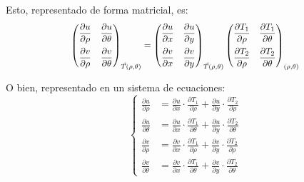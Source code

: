 Esto, representado de forma matricial, es:
\begin{equation*}
    \scale{0.9}{
    \begin{pmatrix}
        \dfrac{\partial u}{\partial \rho} & \dfrac{\partial u}{\partial \theta}
        \\[1em]
        \dfrac{\partial v}{\partial \rho} & \dfrac{\partial v}{\partial \theta}
    \end{pmatrix}_{\Vec{T}(\rho,\theta)}
    =
    \begin{pmatrix}
        \dfrac{\partial u}{\partial x} & \dfrac{\partial u}{\partial y}
        \\[1em]
        \dfrac{\partial v}{\partial x} & \dfrac{\partial v}{\partial y}
    \end{pmatrix}_{\Vec{T}(\rho,\theta)}
    \begin{pmatrix}
        \dfrac{\partial T_1}{\partial \rho} & \dfrac{\partial T_1}{\partial \theta}
        \\[1em]
        \dfrac{\partial T_2}{\partial \rho} & \dfrac{\partial T_2}{\partial \theta}
    \end{pmatrix}_{(\rho,\theta)}
    }
\end{equation*}

O bien, representado en un sistema de ecuaciones:
\begin{equation*}
    \left\{
    \begin{aligned}
        \frac{\partial u}{\partial \rho} &=
        \frac{\partial u}{\partial x} \cdot \frac{\partial T_1}{\partial \rho} + \frac{\partial u}{\partial y} \cdot \frac{\partial T_2}{\partial \rho}
        \\[1ex]
        \frac{\partial u}{\partial \theta} &=
        \frac{\partial u}{\partial x} \cdot \frac{\partial T_1}{\partial \theta} + \frac{\partial u}{\partial y} \cdot \frac{\partial T_2}{\partial \theta}
        \\[1ex]
        \frac{\partial v}{\partial \rho} &=
        \frac{\partial v}{\partial x} \cdot \frac{\partial T_1}{\partial \rho} + \frac{\partial v}{\partial y} \cdot \frac{\partial T_2}{\partial \rho}
        \\[1ex]
        \frac{\partial v}{\partial \theta} &=
        \frac{\partial v}{\partial x} \cdot \frac{\partial T_1}{\partial \theta} + \frac{\partial v}{\partial y} \cdot \frac{\partial T_2}{\partial \theta}
    \end{aligned}
    \right.
\end{equation*}

